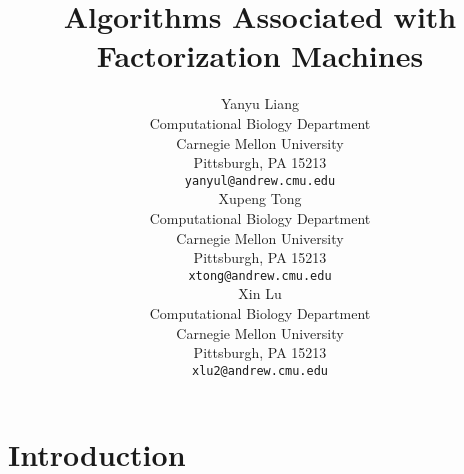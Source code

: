 \documentclass{article}
\title{Algorithms Associated with Factorization Machines}
\author{
  Yanyu Liang \\
  Computational Biology Department\\
  Carnegie Mellon University\\
  Pittsburgh, PA 15213 \\
  \texttt{yanyul@andrew.cmu.edu} \\
  \And
  Xupeng Tong \\
  Computational Biology Department\\
  Carnegie Mellon University\\
  Pittsburgh, PA 15213 \\
  \texttt{xtong@andrew.cmu.edu} \\
  \AND
  Xin Lu \\
  Computational Biology Department\\
  Carnegie Mellon University\\
  Pittsburgh, PA 15213 \\
  \texttt{xlu2@andrew.cmu.edu} \\
}
\begin{document}

\maketitle


\section{Introduction}
\end{document}
